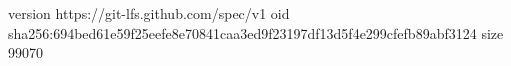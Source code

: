 version https://git-lfs.github.com/spec/v1
oid sha256:694bed61e59f25eefe8e70841caa3ed9f23197df13d5f4e299cfefb89abf3124
size 99070

